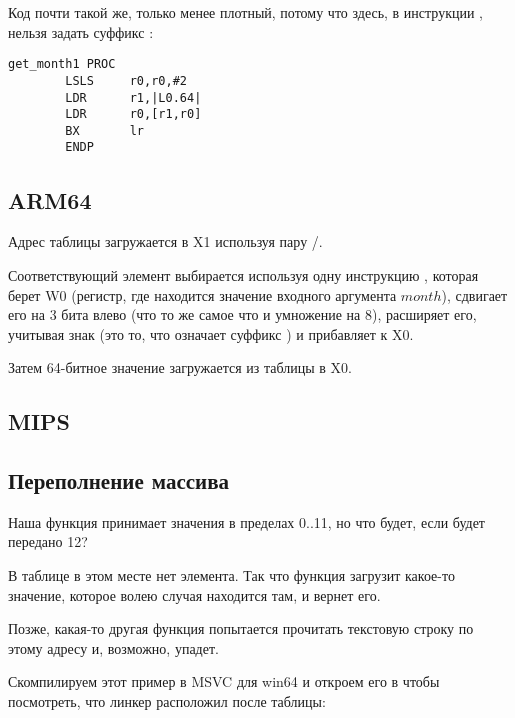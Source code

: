 Код почти такой же, только менее плотный, потому что здесь, в инструкции \LDR, нельзя задать суффикс \LSL:

\begin{lstlisting}
get_month1 PROC
        LSLS     r0,r0,#2
        LDR      r1,|L0.64|
        LDR      r0,[r1,r0]
        BX       lr
        ENDP
\end{lstlisting}

\subsection{ARM64}



Адрес таблицы загружается в X1 используя пару \ADRP/\ADD.

Соответствующий элемент выбирается используя одну инструкцию \LDR, которая берет W0
(регистр, где находится значение входного аргумента $month$), сдвигает его на 3 бита влево
(что то же самое что и умножение на 8),
расширяет его, учитывая знак (это то, что означает суффикс ) и прибавляет к X0.

Затем 64-битное значение загружается из таблицы в X0.

\subsection{MIPS}



\subsection{Переполнение массива}

Наша функция принимает значения в пределах 0..11, но что будет, если будет передано 12?

В таблице в этом месте нет элемента.
Так что функция загрузит какое-то значение, которое волею случая находится там, и вернет его.

Позже, какая-то другая функция попытается прочитать текстовую строку по этому адресу и, возможно, упадет.

Скомпилируем этот пример в MSVC для win64 и откроем его в \IDA чтобы посмотреть, что линкер расположил
после таблицы:



